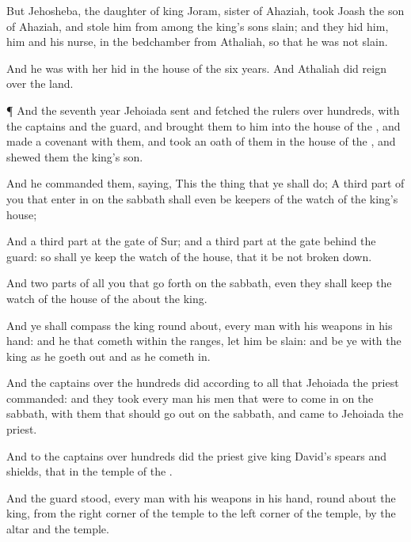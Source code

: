 {But
Jehosheba, the
daughter of
king
Joram,
sister of
Ahaziah,
took
Joash the
son of
Ahaziah, and
stole him from
among the
king’s
sons
{}
slain; and they
hid him,
{} him and his
nurse, in the
bedchamber
from
Athaliah, so that he was not
slain.

And he was with her
hid in the
house of the
{}
six
years. And
Athaliah did
reign over the
land.


\par }{\PP {}¶ And the
seventh
year
Jehoiada
sent and
fetched the
rulers over
hundreds, with the
captains and the
guard, and
brought them to him into the
house of the
{}, and
made a
covenant with them, and took an
oath of them in the
house of the
{}, and
shewed them the
king’s
son.

And he
commanded them,
saying, This
{} the
thing that ye shall
do; A third
part of you that enter
in on the
sabbath shall even be
keepers of the
watch of the
king’s
house;

And a third
part
{} at the
gate of
Sur; and a third
part at the
gate
behind the
guard: so shall ye
keep the
watch of the
house, that it be not broken
down.

And
two
parts of all you that go
forth on the
sabbath, even they shall
keep the
watch of the
house of the
{}
about the
king.

And ye shall
compass the
king round
about, every
man with his
weapons in his
hand: and he that
cometh within the
ranges, let him be
slain: and be ye with the
king as he goeth
out and as he cometh
in.

And the
captains over the
hundreds
did according to all
{} that
Jehoiada the
priest
commanded: and they
took every
man his
men that were to come
in on the
sabbath, with them that should go
out on the
sabbath, and
came to
Jehoiada the
priest.

And to the
captains over
hundreds did the
priest
give
king
David’s
spears and
shields, that
{} in the
temple of the
{}.

And the
guard
stood, every
man with his
weapons in his
hand, round
about the
king, from the
right
corner of the
temple to the
left
corner of the
temple,
{} by the
altar and the
temple.

}
